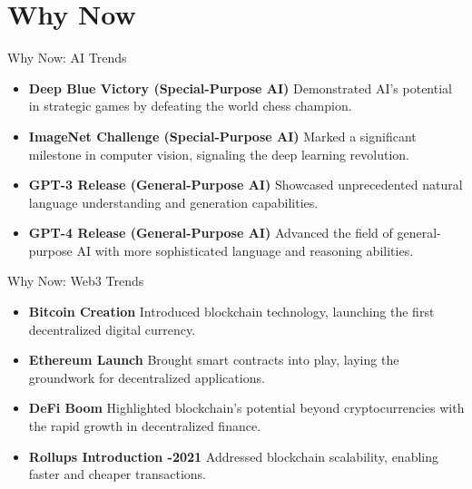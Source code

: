 \documentclass{beamer}
\begin{document}
\section{Why Now}

\begin{frame}{Why Now: AI Trends}
\begin{itemize}
    \item \textbf{Deep Blue Victory (Special-Purpose AI)  \textbar} Demonstrated AI's potential in strategic games by defeating the world chess champion.
    \item \textbf{ImageNet Challenge (Special-Purpose AI)  \textbar} Marked a significant milestone in computer vision, signaling the deep learning revolution.
    \item \textbf{GPT-3 Release (General-Purpose AI)  \textbar} Showcased unprecedented natural language understanding and generation capabilities.
    \item \textbf{GPT-4 Release (General-Purpose AI)  \textbar} Advanced the field of general-purpose AI with more sophisticated language and reasoning abilities.
\end{itemize}
\end{frame}

\begin{frame}{Why Now: Web3 Trends}
\begin{itemize}
    \item \textbf{Bitcoin Creation  \textbar} Introduced blockchain technology, launching the first decentralized digital currency.
    \item \textbf{Ethereum Launch  \textbar} Brought smart contracts into play, laying the groundwork for decentralized applications.
    \item \textbf{DeFi Boom  \textbar} Highlighted blockchain's potential beyond cryptocurrencies with the rapid growth in decentralized finance.
    \item \textbf{Rollups Introduction -2021 \textbar} Addressed blockchain scalability, enabling faster and cheaper transactions.
\end{itemize}
\end{frame}
\end{document}
